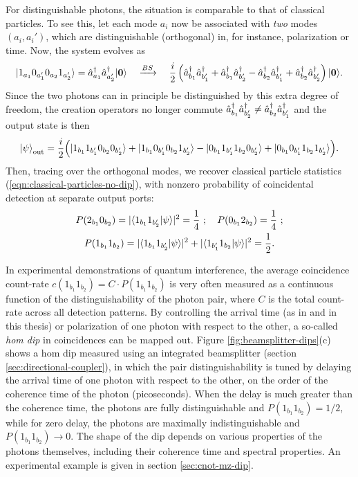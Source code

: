 For distinguishable photons, the situation is comparable to that of classical particles. 
To see this, let each mode $a_i$ now be associated with \emph{two} modes $(a_i, a_i')$, which are distinguishable (orthogonal) in, for instance, polarization or time. Now, the system evolves as 
\begin{align}
    \mbox{$ | 1_{a_1}0_{a_1'}0_{a_2}1_{a_2'} \rangle $} = \hat{a}^{\dagger}_{a_1} \hat{a}^{\dagger}_{a_2'} \mbox{$ | \mathbf{0} \rangle $} 
    \quad  \xrightarrow{BS} \quad
    \frac{i}{2} 
    \left(   \hat{a}^{\dagger}_{b_1}\hat{a}^{\dagger}_{b_1'} +  \hat{a}^{\dagger}_{b_1} \hat{a}^{\dagger}_{b_2'} -\hat{a}^{\dagger}_{b_2} \hat{a}^{\dagger}_{b_1'} + \hat{a}^{\dagger}_{b_2}\hat{a}^{\dagger}_{b_2'}  \right)\mbox{$ | \mathbf{0} \rangle $}.
\end{align}
Since the two photons can in principle be distinguished by this extra degree of freedom, the creation operators no longer commute
$\hat{a}^{\dagger}_{b_1}\hat{a}^{\dagger}_{b_2'}\ne\hat{a}^{\dagger}_{b_2}\hat{a}^{\dagger}_{b_1'}$ and the output state is then
\begin{equation}
    \mbox{$ | \psi \rangle $}_{\mathrm{out}}= 
    \frac{i}{2} 
    \Bigl(
      \mbox{$ | 1_{b_1}1_{b_1'}0_{b_2}0_{b_2'} \rangle $} 
    + \mbox{$ | 1_{b_1}0_{b_1'}0_{b_2}1_{b_2'} \rangle $} 
    - \mbox{$ | 0_{b_1}1_{b_1'}1_{b_2}0_{b_2'} \rangle $} 
    + \mbox{$ | 0_{b_1}0_{b_1'}1_{b_2}1_{b_2'} \rangle $}
\Bigl).
\end{equation}
Then, tracing over the orthogonal modes, we recover classical particle statistics (\ref{eqn:classical-particles-no-dip}), with nonzero probability of coincidental detection at separate output ports:
\begin{gather}
    P(2_{b_1}0_{b_2}) = |\langle 1_{b_1} 1_{b_2'} | \psi \rangle|^2 = \frac{1}{4}~; \quad 
    P(0_{b_1}2_{b_2}) = \frac{1}{4}~;\\
    P(1_{b_1}1_{b_2}) = |\langle 1_{b_1} 1_{b_2'} | \psi \rangle|^2  + |\langle 1_{b_1'} 1_{b_2} | \psi \rangle|^2 = \frac{1}{2}.
\end{gather}

In experimental demonstrations of quantum interference, the average coincidence count-rate $c(1_{b_1}1_{b_2}) = C\cdot P(1_{b_1}1_{b_2})$ is very often measured as a continuous function of the distinguishability of the photon pair, where $C$ is the total count-rate across all detection patterns. By controlling the arrival time (as in \cite{Hong1987} and in this thesis) or polarization of one photon with respect to the other, a so-called \emph{\gls{hom} dip} in coincidences can be mapped out. 
Figure \ref{fig:beamsplitter-dips}(c) shows a \gls{hom} dip measured using an integrated beamsplitter (section \ref{sec:directional-coupler}), in which the pair distinguishability is tuned by delaying the arrival time of one photon with respect to the other, on the order of the coherence time of the photon (picoseconds). When the delay is much greater than the coherence time, the photons are fully distinguishable and $P(1_{b_1}1_{b_2})=1/2$, while for zero delay, the photons are maximally indistinguishable and $P(1_{b_1}1_{b_2})\rightarrow0$.  The shape of the dip depends on various properties of the photons themselves, including their coherence time and spectral properties. An experimental example is given in section \ref{sec:cnot-mz-dip}.


